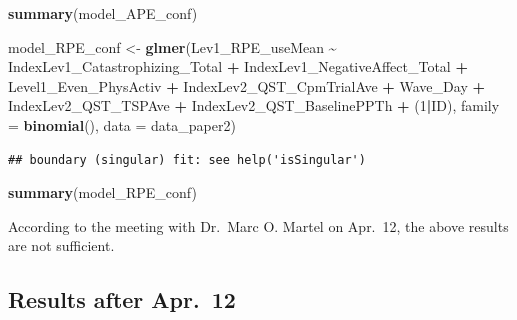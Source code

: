 \documentclass[
  12pt,
]{article}
\newenvironment{Shaded}{\begin{snugshade}}{\end{snugshade}}
\newcommand{\AttributeTok}[1]{\textcolor[rgb]{0.13,0.29,0.53}{#1}}
\newcommand{\DecValTok}[1]{\textcolor[rgb]{0.00,0.00,0.81}{#1}}
\newcommand{\FunctionTok}[1]{\textcolor[rgb]{0.13,0.29,0.53}{\textbf{#1}}}
\newcommand{\NormalTok}[1]{#1}
\newcommand{\OtherTok}[1]{\textcolor[rgb]{0.56,0.35,0.01}{#1}}
\newcommand{\SpecialCharTok}[1]{\textcolor[rgb]{0.81,0.36,0.00}{\textbf{#1}}}
\begin{document}
\begin{Shaded}
\begin{Highlighting}[]
\FunctionTok{summary}\NormalTok{(model\_APE\_conf)}

\NormalTok{model\_RPE\_conf }\OtherTok{\textless{}{-}} \FunctionTok{glmer}\NormalTok{(Lev1\_RPE\_useMean }\SpecialCharTok{\textasciitilde{}}\NormalTok{ IndexLev1\_Catastrophizing\_Total }\SpecialCharTok{+}\NormalTok{ IndexLev1\_NegativeAffect\_Total }\SpecialCharTok{+}\NormalTok{ Level1\_Even\_PhysActiv }\SpecialCharTok{+}\NormalTok{ IndexLev2\_QST\_CpmTrialAve }\SpecialCharTok{+}\NormalTok{ Wave\_Day }\SpecialCharTok{+}\NormalTok{ IndexLev2\_QST\_TSPAve }\SpecialCharTok{+}\NormalTok{ IndexLev2\_QST\_BaselinePPTh }\SpecialCharTok{+}\NormalTok{ (}\DecValTok{1}\SpecialCharTok{|}\NormalTok{ID), }\AttributeTok{family =} \FunctionTok{binomial}\NormalTok{(), }\AttributeTok{data =}\NormalTok{ data\_paper2)}
\end{Highlighting}
\end{Shaded}

\begin{verbatim}
## boundary (singular) fit: see help('isSingular')
\end{verbatim}

\begin{Shaded}
\begin{Highlighting}[]
\FunctionTok{summary}\NormalTok{(model\_RPE\_conf)}
\end{Highlighting}
\end{Shaded}

According to the meeting with Dr.~Marc O. Martel on Apr.~12, the above
results are not sufficient.

\newpage

\hypertarget{results-after-apr.-12}{%
\subsection{Results after Apr.~12}\label{results-after-apr.-12}}
\end{document}
